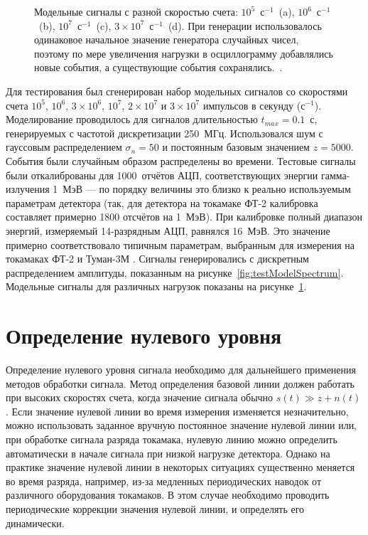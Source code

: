 \begin{figure}[ht!]
  \caption{ Модельные сигналы с разной скоростью счета: $10^5$~с${}^{-1}$~(a), $10^6$~с${}^{-1}$~(b), $10^7$~с${}^{-1}$~(c), $3\times10^7$~с${}^{-1}$~(d). При генерации использовалось одинаковое начальное значение генератора случайных чисел, поэтому по мере увеличения нагрузки в осциллограмму добавлялись новые события, а существующие события сохранялись.~\cite{Khilkevitch2020}.}
  \label{fig:testModelSignal}
\end{figure}

Для тестирования был сгенерирован набор модельных сигналов со скоростями счета $10^5$, $10^6$, $3\times10^6$, $10^7$, $2\times10^7$ и $3\times10^7$ импульсов в секунду (с${}^{-1}$). Моделирование проводилось для сигналов длительностью $t_{max} = 0.1$~с, генерируемых с частотой дискретизации 250~МГц. Использовался шум с гауссовым распределением $\sigma_n = 50$ и постоянным базовым значением $z = 5000$. События были случайным образом распределены во времени. Тестовые сигналы были откалиброваны для 1000~отчётов АЦП, соответствующих энергии гамма-излучения 1~МэВ --- по порядку величины это близко к реально используемым параметрам детектора (так, для детектора на токамаке ФТ-2 калибровка составляет примерно 1800 отсчётов на 1~МэВ). При калибровке полный диапазон энергий, измеряемый 14-разрядным АЦП, равнялся 16~МэВ. Это значение примерно соответствовало типичным параметрам, выбранным для измерения на токамаках ФТ-2 \cite{Shevelev2016,Shevelev2017} и Туман-3М \cite{Shevelev2018}. Сигналы генерировались с дискретным распределением амплитуды, показанным на рисунке~\ref{fig:testModelSpectrum}. Модельные сигналы для различных нагрузок показаны на рисунке~\ref{fig:testModelSignal}.  \cite{Khilkevitch2020}


\section{Определение нулевого уровня}

Определение нулевого уровня сигнала необходимо для дальнейшего применения методов обработки сигнала. Метод определения базовой линии должен работать при высоких скоростях счета, когда значение сигнала обычно $s(t) \gg z + n(t)$. Если значение нулевой линии во время измерения изменяется незначительно, можно использовать заданное вручную постоянное значение нулевой линии или, при обработке сигнала разряда токамака, нулевую линию можно определить автоматически в начале сигнала при низкой нагрузке детектора. Однако на практике значение нулевой линии в некоторых ситуациях существенно меняется во время разряда, например, из-за медленных периодических наводок от различного оборудования токамаков. В этом случае необходимо проводить периодические коррекции значения нулевой линии, и определять его динамически.

